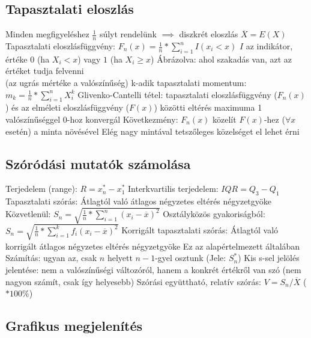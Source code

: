 \documentclass[12pt,a4paper]{article}
\begin{document}
\subsection{Tapasztalati eloszlás}

\begin{outline}
	\1 Minden megfigyeléshez $\frac{1}{n}$ súlyt rendelünk $\implies$ diszkrét eloszlás
	\1 $\overline{X} = E(X)$
	\1 Tapasztalati eloszlásfüggvény: $F_n(x) = \frac{1}{n} * \sum_{i=1}^{n} I(x_i < x)$
		\2 $I$ az indikátor, értéke $0$ (ha $X_i < x$) vagy $1$ (ha $X_i \ge x$)
		\2 Ábrázolva: ahol szakadás van, azt az értéket tudja felvenni\\
		(az ugrás mértéke a valószínűség)
	\1 k-adik tapasztalati momentum: $m_k = \frac{1}{n} * \sum_{i=1}^n X_i^k$
	\1 Glivenko-Cantelli tétel: tapasztalati eloszlásfüggvény ($F_n(x)$) és az elméleti eloszlásfüggvény ($F(x)$) közötti eltérés maximuma 1 valószínűséggel 0-hoz konvergál
		\2 Következmény: $F_n(x)$ közelít $F(x)$-hez ($\forall x$ esetén) a minta növésével
		\2 Elég nagy mintával tetszőleges közelséget el lehet érni
\end{outline}

\pagebreak

\subsection{Szóródási mutatók számolása}

\begin{outline}
	\1 Terjedelem (range): $R = x_n^* - x_1^*$
	\1 Interkvartilis terjedelem: $IQR = Q_3 - Q_1$
	\1 Tapasztalati szórás:
		\2 Átlagtól való átlagos négyzetes eltérés négyzetgyöke
		\2 Közvetlenül: $S_n = \sqrt{\frac{1}{n}*\sum_{i=1}^{n} (x_i - \overline{x})^2}$
		\2 Osztályközös gyakoriságból: $S_n = \sqrt{\frac{1}{n}*\sum_{i=1}^{k} f_i (x_i - \overline{x})^2}$
	\1 Korrigált tapasztalati szórás:
		\2 Átlagtól való korrigált átlagos négyzetes eltérés négyzetgyöke
		\2 Ez az alapértelmezett általában
		\2 Számítás: ugyan az, csak $n$ helyett $n-1$-gyel osztunk (Jele: $S^*_n$)
		\2 Kis s-sel jelölés jelentése: nem a valószínűségi változóról, hanem a konkrét értékről van szó (nem nagyon számít, csak így helyesebb)
	\1 Szórási együttható, relatív szórás: $V=S_n/\overline{X}$ ($*100\%$)
\end{outline}

\pagebreak

\subsection{Grafikus megjelenítés}
\end{document}
